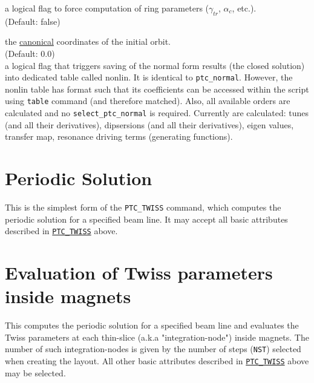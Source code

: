 \begin{madlist}
   a logical flag to force computation of ring
  parameters ($\gamma_{tr}$, $\alpha_c$, etc.). \\ 
  (Default: false)

   the
  \hyperref[subsec:tables-canon]{canonical} coordinates of the initial
  orbit. \\ (Default: 0.0) \\
  
   a logical flag that triggers saving of the normal form results 
  (the closed solution) into dedicated table called nonlin.   It is identical to \texttt{ptc\_normal}.
   However, the nonlin table has format such that its coefficients can be accessed within the script using 
   \texttt{table} command (and therefore matched). Also, all available orders are calculated and 
   no \texttt{select\_ptc\_normal} is required.
   Currently are calculated: tunes (and all their derivatives), 
   dipsersions (and all their derivatives), eigen values, transfer map, resonance driving terms (generating functions).
   
  
\end{madlist}


\section{Periodic Solution}
\label{sec:ptc-twiss-periodic}	

This is the simplest form of the \texttt{PTC\_TWISS} command, which
computes the periodic solution for a specified beam line. It may
accept all basic attributes described in
\hyperref[sec:ptc-twiss]{\texttt{PTC\_TWISS}} above. 



\section{Evaluation of Twiss parameters inside magnets}
\label{sec:ptc-twiss-slicing}

This computes the periodic solution for a specified beam
line and evaluates the Twiss parameters at each thin-slice
(a.k.a "integration-node") inside magnets. The number of such
integration-nodes is given by the number of steps (\texttt{NST})
selected when creating the \ptc layout. All other basic
attributes described in \hyperref[sec:ptc-twiss]{\texttt{PTC\_TWISS}}
above may be selected.

